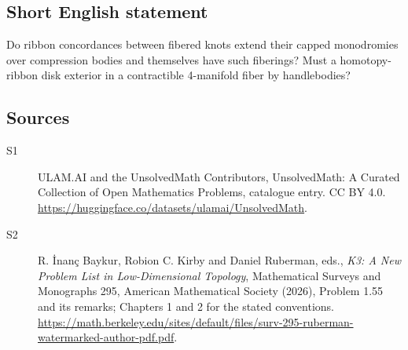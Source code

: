 \documentclass[11pt]{article}
\begin{document}
\subsection{Short English statement}
Do ribbon concordances between fibered knots extend their capped monodromies over compression bodies and themselves have such fiberings? Must a homotopy-ribbon disk exterior in a contractible 4-manifold fiber by handlebodies?
\subsection{Sources}
\begin{description}
\item[\hypertarget{source:statement:1}{S1}] ULAM.AI and the UnsolvedMath Contributors, UnsolvedMath: A Curated Collection of Open Mathematics Problems, catalogue entry. CC BY 4.0. \url{https://huggingface.co/datasets/ulamai/UnsolvedMath}.
\item[\hypertarget{source:statement:2}{S2}] R. İnanç Baykur, Robion C. Kirby and Daniel Ruberman, eds., \emph{K3: A New Problem List in Low-Dimensional Topology}, Mathematical Surveys and Monographs 295, American Mathematical Society (2026), Problem 1.55 and its remarks; Chapters 1 and 2 for the stated conventions. \url{https://math.berkeley.edu/sites/default/files/surv-295-ruberman-watermarked-author-pdf.pdf}.
\end{description}
\label{end:statement}
\end{document}
